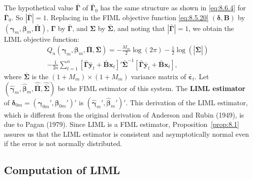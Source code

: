 The hypothetical value $\bar{\boldsymbol{\Gamma}}$ of $\bar{\boldsymbol{\Gamma}}_0$ has the same structure as shown in \eqref{eq:8.6.4} for
$\bar{\boldsymbol{\Gamma}}_0$. So $|\bar{\boldsymbol{\Gamma}}| = 1$. Replacing in the FIML objective function \eqref{eq:8.5.20}
$(\boldsymbol{\delta}, \mathbf{B})$
by $(\boldsymbol{\gamma}_m, \boldsymbol{\beta}_m, \bar{\boldsymbol{\Pi}})$,
$\boldsymbol{\Gamma}$ by $\bar{\boldsymbol{\Gamma}}$, and $\boldsymbol{\Sigma}$ by $\bar{\boldsymbol{\Sigma}}$, and noting that
$|\bar{\boldsymbol{\Gamma}}| = 1$, we obtain the LIML
objective function:
\begin{multline}
  Q_n(\boldsymbol{\gamma}_m, \boldsymbol{\beta}_m, \bar{\boldsymbol{\Pi}}, \bar{\boldsymbol{\Sigma}})
  = -\frac{M_m}{2}\log(2\pi)
    - \frac{1}{2}\log(|\bar{\boldsymbol{\Sigma}}|) \\
    - \frac{1}{2n}\sum_{t=1}^{n}
      [\bar{\boldsymbol{\Gamma}}\bar{\mathbf{y}}_t + \bar{\mathbf{B}}\mathbf{x}_t]'
      \bar{\boldsymbol{\Sigma}}^{-1}
      [\bar{\boldsymbol{\Gamma}}\bar{\mathbf{y}}_t + \bar{\mathbf{B}}\mathbf{x}_t],
  \label{eq:8.6.6} \tag{8.6.6}
\end{multline}
where $\bar{\boldsymbol{\Sigma}}$ is the $(1 + M_m) \times (1 + M_m)$ variance matrix of
$\bar{\boldsymbol{\varepsilon}}_t$. Let
$(\hat{\boldsymbol{\gamma}}_m, \hat{\boldsymbol{\beta}}_m, \hat{\bar{\boldsymbol{\Pi}}}, \hat{\bar{\boldsymbol{\Sigma}}})$
be the FIML estimator of this system. The \textbf{LIML estimator} of
$\boldsymbol{\delta}_{0m} = (\boldsymbol{\gamma}_{0m}', \boldsymbol{\beta}_{0m}')'$
is $(\hat{\boldsymbol{\gamma}}_m', \hat{\boldsymbol{\beta}}_m')'$. This derivation of the LIML estimator, which is different from the
original derivation of Anderson and Rubin (1949), is due to Pagan (1979). Since
LIML is a FIML estimator, Proposition~\ref{prop:8.1} assures us that the LIML estimator is
consistent and asymptotically normal even if the error is not normally distributed.

\subsection*{Computation of LIML}

